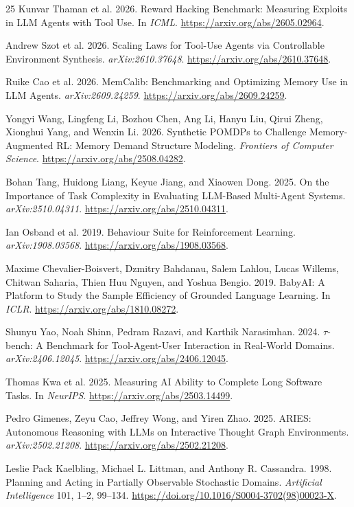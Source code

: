 \documentclass[sigconf,nonacm]{acmart}
\begin{document}
\begin{thebibliography}{25}
Kunvar Thaman et al. 2026.
Reward Hacking Benchmark: Measuring Exploits in LLM Agents with Tool Use.
In \emph{ICML}. \url{https://arxiv.org/abs/2605.02964}.

Andrew Szot et al. 2026.
Scaling Laws for Tool-Use Agents via Controllable Environment Synthesis.
\emph{arXiv:2610.37648}. \url{https://arxiv.org/abs/2610.37648}.

Ruike Cao et al. 2026.
MemCalib: Benchmarking and Optimizing Memory Use in LLM Agents.
\emph{arXiv:2609.24259}. \url{https://arxiv.org/abs/2609.24259}.

Yongyi Wang, Lingfeng Li, Bozhou Chen, Ang Li, Hanyu Liu, Qirui Zheng,
Xionghui Yang, and Wenxin Li. 2026.
Synthetic POMDPs to Challenge Memory-Augmented RL: Memory Demand Structure
Modeling. \emph{Frontiers of Computer Science}.
\url{https://arxiv.org/abs/2508.04282}.

Bohan Tang, Huidong Liang, Keyue Jiang, and Xiaowen Dong. 2025.
On the Importance of Task Complexity in Evaluating LLM-Based Multi-Agent
Systems. \emph{arXiv:2510.04311}.
\url{https://arxiv.org/abs/2510.04311}.

Ian Osband et al. 2019.
Behaviour Suite for Reinforcement Learning. \emph{arXiv:1908.03568}.
\url{https://arxiv.org/abs/1908.03568}.

Maxime Chevalier-Boisvert, Dzmitry Bahdanau, Salem Lahlou, Lucas Willems,
Chitwan Saharia, Thien Huu Nguyen, and Yoshua Bengio. 2019.
BabyAI: A Platform to Study the Sample Efficiency of Grounded Language
Learning. In \emph{ICLR}. \url{https://arxiv.org/abs/1810.08272}.

Shunyu Yao, Noah Shinn, Pedram Razavi, and Karthik Narasimhan. 2024.
$\tau$-bench: A Benchmark for Tool-Agent-User Interaction in Real-World
Domains. \emph{arXiv:2406.12045}.
\url{https://arxiv.org/abs/2406.12045}.

Thomas Kwa et al. 2025.
Measuring AI Ability to Complete Long Software Tasks.
In \emph{NeurIPS}. \url{https://arxiv.org/abs/2503.14499}.

Pedro Gimenes, Zeyu Cao, Jeffrey Wong, and Yiren Zhao. 2025.
ARIES: Autonomous Reasoning with LLMs on Interactive Thought Graph
Environments. \emph{arXiv:2502.21208}.
\url{https://arxiv.org/abs/2502.21208}.

Leslie Pack Kaelbling, Michael L. Littman, and Anthony R. Cassandra. 1998.
Planning and Acting in Partially Observable Stochastic Domains.
\emph{Artificial Intelligence} 101, 1--2, 99--134.
\url{https://doi.org/10.1016/S0004-3702(98)00023-X}.


\end{thebibliography}
\end{document}
